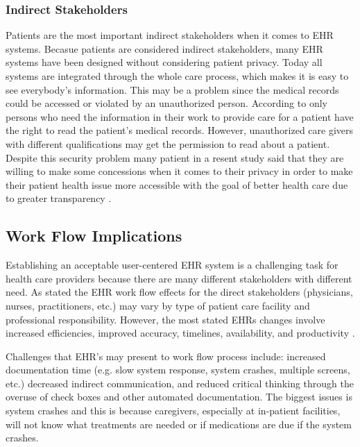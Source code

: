 \documentclass[14pt]{article}
\begin{document}
\subsubsection{Indirect Stakeholders}
\label{sec:peopleIndirect}
Patients are the most important indirect stakeholders when it comes to \gls{EHR} systems. Becasue patients are considered indirect stakeholders, many \gls{EHR} systems have been designed without considering patient privacy. Today all systems are integrated through the whole care process, which makes it is easy to see everybody's information. This may be a problem since the medical records could be accessed or violated by an unauthorized person. According to \cite{PatientDataAct} only persons who need the information in their work to provide care for a patient have the right to read the patient's medical records. However, unauthorized care givers with different qualifications may get the permission to read  about a  patient. Despite this security problem many patient in a resent study said that they are willing to make some concessions when it comes to their privacy in order to make their patient health issue more accessible with the goal of better health care due to greater transparency \cite{Merrill}.


\subsection{Work Flow Implications}
\label{sec:peopleWorkflow}
Establishing an acceptable user-centered \gls{EHR} system is a challenging task for health care providers because there are many different stakeholders with different need. As stated the \gls{EHR} work flow effects for the direct stakeholders (physicians, nurses, practitioners, etc.) may vary by type of patient care facility and professional responsibility. However, the most stated \glspl{EHR} changes involve increased efficiencies, improved accuracy, timelines, availability, and productivity \cite{Allan}.

Challenges that  \gls{EHR}'s may present to work flow process include: increased documentation time (e.g. slow system response, system crashes, multiple screens, etc.) decreased indirect communication, and reduced critical thinking through the overuse of check boxes and other automated documentation. The biggest issues is system crashes and this is because caregivers, especially at in-patient facilities, will not know what treatments are needed or if medications are due if the system crashes. 
\end{document}
